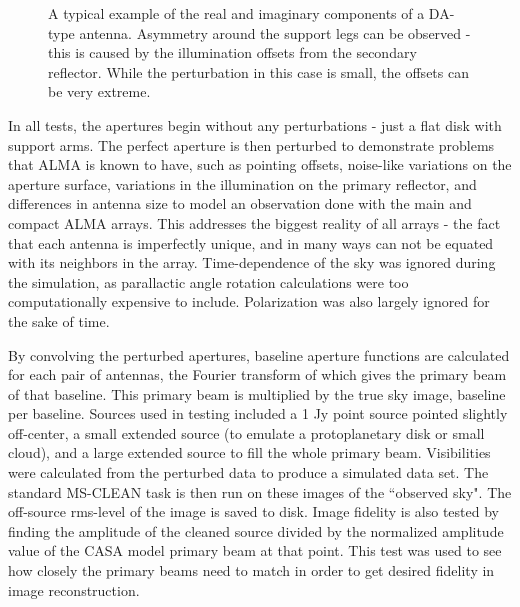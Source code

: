 \documentclass[11pt]{article}
\begin{document}
\begin{figure}
    \centering
    \quad
    \caption{
        A typical example of the real and imaginary components of a DA-type 
        antenna. Asymmetry around the support legs can be observed - this is 
        caused by the illumination offsets from the secondary reflector. While 
        the perturbation in this case is small, the offsets can be very 
        extreme.  }
    \label{fig:apertures}
\end{figure}

In all tests, the apertures begin without any perturbations - just a flat disk 
with support arms. The perfect aperture is then perturbed to demonstrate 
problems that ALMA is known to have, such as pointing offsets,
noise-like variations on the aperture surface, variations in the illumination 
on the primary reflector, and differences in antenna size to model an 
observation done with the main and compact ALMA arrays. This addresses the 
biggest reality of all arrays - the fact that each antenna is imperfectly 
unique, and in many ways can not be equated with its neighbors in the array.
Time-dependence of the sky was ignored during the simulation, as parallactic 
angle rotation calculations were too computationally expensive to include.  
Polarization was also largely ignored for the sake of time.

By convolving the perturbed apertures, baseline aperture functions are 
calculated for each pair of antennas, the Fourier transform of which gives the 
primary beam of that baseline. This primary beam is multiplied by the true sky 
image, baseline per baseline.  Sources used in testing included a 1 Jy point 
source pointed slightly off-center, a small extended source (to emulate a 
protoplanetary disk or small cloud), and a large extended source to fill the 
whole primary beam.  Visibilities were calculated from the perturbed data to 
produce a simulated data set. The standard MS-CLEAN task is then run on these 
images of the ``observed sky".  The off-source rms-level of the image is saved 
to disk. Image fidelity is also tested by finding the amplitude of the cleaned 
source divided by the normalized amplitude value of the CASA model primary beam 
at that point.  This test was used to see how closely the primary beams need to 
match in order to get desired fidelity in image reconstruction.
\end{document}
